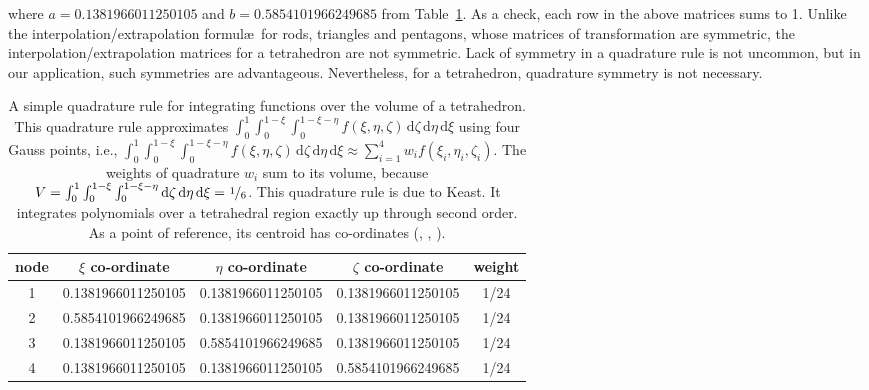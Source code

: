 where $a = 0.1381966011250105$ and $b = 0.5854101966249685$ from Table~\ref{tab:4nodedTet}.  As a check, each row in the above matrices sums to 1.  Unlike the interpolation\slash extrapolation formul\ae\ for rods, triangles and pentagons, whose matrices of transformation are symmetric, the interpolation\slash extrapolation matrices for a tetrahedron are not symmetric.  Lack of symmetry in a quadrature rule is not uncommon, but in our application, such symmetries are advantageous.  Nevertheless, for a tetrahedron, quadrature symmetry is not necessary.
    
\begin{table}
    \small
    \begin{tabular}{|c|cccc|}
        \hline
        node & $\xi$ co-ordinate & $\eta$ co-ordinate & 
        $\zeta$ co-ordinate & weight \\ \hline        
        1 & 0.1381966011250105 & 0.1381966011250105 & 0.1381966011250105 & 1/24 \\
        2 & 0.5854101966249685 & 0.1381966011250105 & 0.1381966011250105 & 1/24 \\
        3 & 0.1381966011250105 & 0.5854101966249685 & 0.1381966011250105 & 1/24 \\
        4 & 0.1381966011250105 & 0.1381966011250105 & 0.5854101966249685 & 1/24 \\
        \hline
    \end{tabular}
    \normalsize
    \caption{A simple quadrature rule for integrating functions over the volume of a tetrahedron.  This quadrature rule approximates $\int_0^1 \int_0^{1-\xi} \int_0^{1-\xi-\eta} f(\xi, \eta, \zeta) \, \mathrm{d}\zeta \, \mathrm{d}\eta \, \mathrm{d}\xi$ using four Gauss points, i.e., $\int_0^1 \int_0^{1-\xi} \int_0^{1-\xi-\eta} f(\xi, \eta, \zeta) \, \mathrm{d}\zeta \, \mathrm{d}\eta \, \mathrm{d}\xi \approx \sum_{i=1}^4 w_i f( \xi_i , \eta_i , \zeta_i )$.  The weights of quadrature $w_i$ sum to its volume, because $V = \int_0^1 \int_0^{1-\xi} \int_0^{1-\xi-\eta} \mathrm{d}\zeta \, \mathrm{d}\eta \, \mathrm{d}\xi = \textfrac{1}{6}$.  This quadrature rule is due to Keast.  It integrates polynomials over a tetrahedral region exactly up through second order.  As a point of reference, its centroid has co-ordinates (, , ).}
    \label{tab:4nodedTet}
\end{table}


